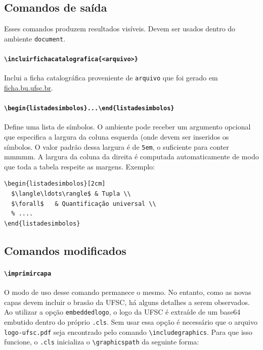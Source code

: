 \documentclass[embeddedlogo]{../ufsc-thesis-rn46-2019}
\newcommand{\lacmd}[1]{\texttt{\textbackslash{}#1}}
\newcommand{\laenv}[1]{\texttt{\textbackslash{}begin\{#1\}...\textbackslash{}end\{#1\}}}
\begin{document}
\subsection{Comandos de saída}

Esses comandos produzem resultados visíveis. Devem ser usados dentro do
ambiente \texttt{document}.

\paragraph*{\lacmd{incluirfichacatalografica\{<arquivo>\}}}
Inclui a ficha catalográfica proveniente de \texttt{arquivo} que foi gerado em
\href{http://ficha.bu.ufsc.br/}{ficha.bu.ufsc.br}.

\paragraph*{\laenv{listadesimbolos}}
Define uma lista de símbolos. O ambiente pode receber um argumento opcional que
especifica a largura da coluna esquerda (onde devem ser inseridos os símbolos. O
valor padrão dessa largura é de \texttt{5em}, o suficiente para conter mmmmm. A
largura da coluna da direita é computada automaticamente de modo que toda a
tabela respeite as margens. Exemplo:

\begin{verbatim}
\begin{listadesimbolos}[2cm]
  $\langle\ldots\rangle$ & Tupla \\
  $\forall$   & Quantificação universal \\
  % ....
\end{listadesimbolos}
\end{verbatim}

\subsection{Comandos \abnTeX{} modificados}

\paragraph*{\lacmd{imprimircapa}} O modo de uso desse comando permanece o
mesmo. No entanto, como as novas capas devem incluir o brasão da UFSC, há alguns
detalhes a serem observados. Ao utilizar a opção \texttt{embeddedlogo}, o logo
da UFSC é extraíde de um base64 embutido dentro do próprio \texttt{.cls}. Sem
usar essa opção é necessário que o arquivo \texttt{logo-ufsc.pdf} seja
encontrado pelo comando \lacmd{includegraphics}. Para que isso funcione, o
\texttt{.cls} inicializa o \lacmd{graphicspath} da seguinte forma:
\end{document}
